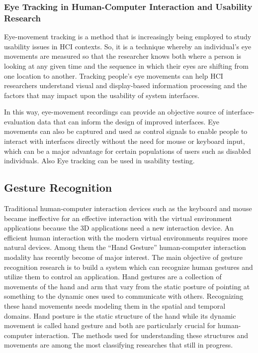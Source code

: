\subsubsection{Eye Tracking in Human-Computer Interaction and Usability Research}

Eye-movement tracking is a method that is increasingly being employed to study usability issues in HCI contexts. So, it is a technique whereby an individual’s eye movements are measured so that the researcher knows both where a person is looking at any given time and the sequence in which their eyes are shifting from one location to another. Tracking people’s eye movements can help HCI researchers understand visual and display-based information processing and the factors that may impact upon the usability of system
interfaces. \bigskip
 
	In this way, eye-movement recordings can provide an objective source of interface-evaluation data that can inform the design of improved interfaces. Eye movements can also be captured and used as control signals to enable people to interact with interfaces directly without the need for mouse or keyboard input, which can be a major advantage for certain populations of users such as disabled individuals. Also Eye tracking can be used in usability testing.\cite{poole2005eye}

\subsection{Gesture Recognition}
Traditional human-computer interaction devices such as the keyboard and mouse became ineffective for an effective interaction with the virtual environment applications because the 3D applications need a new interaction device. An efficient human interaction with the modern virtual environments requires more natural devices. Among them the “Hand Gesture” human-computer interaction modality has recently become of major interest. The main objective of gesture recognition research is to build a system which can recognize human gestures and utilize them to control an application. Hand gestures are a collection of movements of the hand and arm that vary from the static posture of pointing at something to the dynamic ones used to communicate with others. Recognizing these hand movements needs modeling them in the
spatial and temporal domains. Hand posture is the static structure of the hand while its dynamic movement is called hand gesture and both are particularly crucial for human-computer interaction. The methods used for understanding these structures and movements are among the most classifying researches that still in progress.
\bigskip

